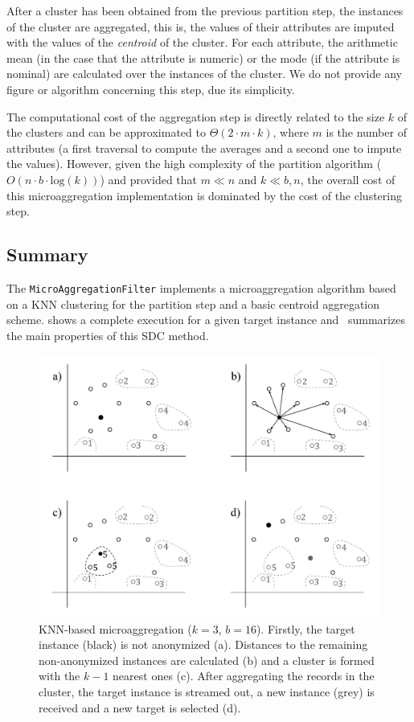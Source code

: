 After a cluster has been obtained from the previous partition step, the instances of the cluster are aggregated, this is, the values of their attributes are imputed with the values of the \textit{centroid} of the cluster. For each attribute, the arithmetic mean (in the case that the attribute is numeric) or the mode (if the attribute is nominal) are calculated over the instances of the cluster. We do not provide any figure or algorithm concerning this step, due its simplicity.

The computational cost of the aggregation step is directly related to the size $k$ of the clusters and can be approximated to $\Theta(2 \cdot m \cdot k)$, where $m$ is the number of attributes (a first traversal to compute the averages and a second one to impute the values). However, given the high complexity of the partition algorithm ($O(n \cdot b \cdot \mathrm{log}(k))$) and provided that $m \ll n$ and $k \ll b, n$, the overall cost of this microaggregation implementation is dominated by the cost of the clustering step.

\subsection{Summary}
\label{Implementation:Microaggregation:Summary}

The \texttt{MicroAggregationFilter} implements a microaggregation algorithm based on a KNN clustering for the partition step and a basic centroid aggregation scheme.  shows a complete execution for a given target instance and~ summarizes the main properties of this SDC method.

\begin{figure}[h]
	\centering
	\includegraphics[width=.8\textwidth]{figures/microaggregation-schematic-2.pdf}
	\caption{KNN-based microaggregation ($k = 3$, $b = 16$). Firstly, the target instance (black) is not anonymized (a). Distances to the remaining non-anonymized instances are calculated (b) and a cluster is formed with the $k-1$ nearest ones (c). After aggregating the records in the cluster, the target instance is streamed out, a new instance (grey) is received and a new target is selected (d).}
	\label{fig:microaggregation-schematic-2}
\end{figure}

